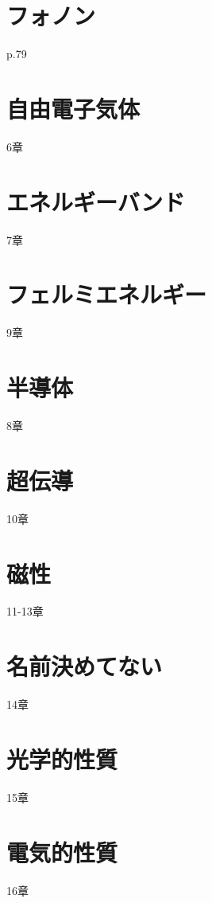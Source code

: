\documentclass[a4paper]{jsreport}
\begin{document}
        

    \chapter{フォノン}
        p.79~
        \section{}
        \section{}
        \section{}
        \section{}
        \section{}
        \section{}
        \section{}
    \section{}
        
    \chapter{自由電子気体}
        6章
    \chapter{エネルギーバンド}
        7章
    \chapter{フェルミエネルギー}
        9章
    \chapter{半導体}
        8章
    \chapter{超伝導}
        10章
    \chapter{磁性}
        11-13章
    \chapter{名前決めてない}
        14章
    \chapter{光学的性質}
        15章
    \chapter{電気的性質}
        16章
    
            
\end{document}
